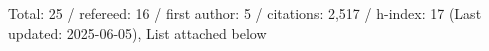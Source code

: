 Total: 25 / refereed: 16 / first author: 5 / citations: 2,517 / h-index: 17 (Last updated: 2025-06-05), List attached below